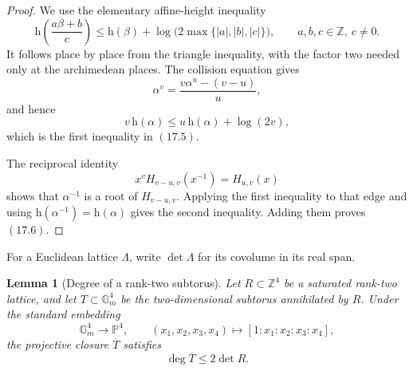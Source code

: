 \documentclass[11pt]{article}
\newtheorem{lemma}[theorem]{Lemma}
\theoremstyle{definition}
\newcommand{\Z}{\mathbb Z}
\begin{document}
\begin{proof}
We use the elementary affine-height inequality
\[
 \mathrm h\!\left(\frac{a\beta+b}{c}\right)
 \leq \mathrm h(\beta)
      +\log\!\bigl(2\max\{|a|,|b|,|c|\}\bigr),
 \qquad a,b,c\in\Z,\ c\neq0.
\]
It follows place by place from the triangle inequality, with the factor two
needed only at the archimedean places.  The collision equation gives
\[
 \alpha^v=\frac{v\alpha^u-(v-u)}u,
\]
and hence
\[
 v\,\mathrm h(\alpha)
 \leq u\,\mathrm h(\alpha)+\log(2v),
\]
which is the first inequality in \((17.5)\).

The reciprocal identity
\[
 x^vH_{v-u,v}(x^{-1})=H_{u,v}(x)
\]
shows that \(\alpha^{-1}\) is a root of \(H_{v-u,v}\).  Applying the first
inequality to that edge and using
\(\mathrm h(\alpha^{-1})=\mathrm h(\alpha)\) gives the second inequality.
Adding them proves \((17.6)\).
\end{proof}

For a Euclidean lattice \(\Lambda\), write \(\det\Lambda\) for its
covolume in its real span.

\begin{lemma}[Degree of a rank-two subtorus]\label{lem:toricdegree}
Let \(R\subset\Z^4\) be a saturated rank-two lattice, and let
\(T\subset\mathbb G_m^4\) be the two-dimensional subtorus annihilated by
\(R\).  Under the standard embedding
\[
 \mathbb G_m^4\longrightarrow\mathbb P^4,
 \qquad
 (x_1,x_2,x_3,x_4)\longmapsto[1:x_1:x_2:x_3:x_4],
\]
the projective closure \(\overline T\) satisfies
\begin{equation}
 \deg\overline T\leq2\det R.
 \tag{17.7}
\end{equation}
\end{lemma}
\end{document}
